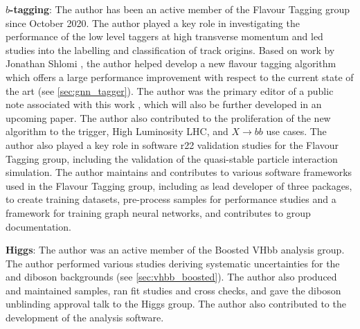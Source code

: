 \textbf{$b$-tagging}:
The author has been an active member of the Flavour Tagging group since October 2020. 
The author played a key role in investigating the performance of the low level taggers at high transverse momentum and led studies into the labelling and classification of track origins.
Based on work by Jonathan Shlomi \cite{2020-gnn-for-sv}, the author helped develop a new flavour tagging algorithm which offers a large performance improvement with respect to the current state of the art (see \cref{sec:gnn_tagger}).
The author was the primary editor of a public note associated with this work \cite{ATL-PHYS-PUB-2022-027}, which will also be further developed in an upcoming paper.
The author also contributed to the proliferation of the new algorithm to the trigger, High Luminosity LHC, and $X \rightarrow bb$ use cases.
The author also played a key role in software r22 validation studies for the Flavour Tagging group, including the validation of the quasi-stable particle interaction simulation.
The author maintains and contributes to various software frameworks used in the Flavour Tagging group, including as lead developer of three packages, to create training datasets, pre-process samples for performance studies and a framework for training graph neural networks, and contributes to group documentation.

\textbf{Higgs}:
The author was an active member of the Boosted VHbb analysis group.
The author performed various studies deriving systematic uncertainties for the \Vjets and diboson backgrounds (see \cref{sec:vhbb_boosted}).
The author also produced and maintained samples, ran fit studies and cross checks, and gave the diboson unblinding approval talk to the Higgs group.
The author also contributed to the development of the analysis software.
